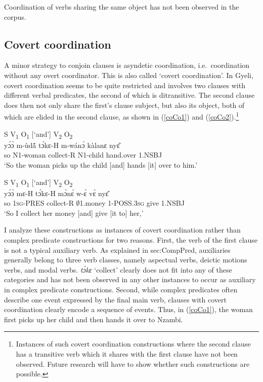 \noindent Coordination of verbs sharing the same object has not been observed in the corpus.


\subsection{Covert coordination}
A minor strategy to conjoin clauses is asyndetic coordination, i.e.\ coordination without any overt coordinator. This is also called `covert coordination'. In Gyeli, covert coordination seems to be quite restricted and involves two clauses with different verbal predicates, the second of which is ditransitive. The second clause does then not only share the first's clause subject, but also its object, both of which are elided in the second clause, as shown in (\ref{coCo1}) and (\ref{coCo2}).\footnote{Instances of such covert coordination constructions where the second clause has a transitive verb which it shares with the first clause have not been observed. Future research will have to show whether such constructions are possible.}

\begin{exe} 
\ex\label{coCo1} S V\textsubscript{1} O\textsubscript{1} [`and'] V\textsubscript{2} O\textsubscript{2}
  \glll [yɔ́ɔ̀ mùdã̂ tɔ́kɛ́ mwánɔ̀] [kàlànɛ̀ nyɛ̂] \\
       yɔ́ɔ̀ m-ùdã̂ tɔ́kɛ-H m-wánɔ̀ kàlanɛ nyɛ̂ \\
       so N1-woman collect-R N1-child hand.over 1.NSBJ\\
    \trans `So the woman picks up the child [and] hands [it] over to him.'
\end{exe}

\begin{exe} 
\ex\label{coCo2} S V\textsubscript{1} O\textsubscript{1} [`and'] V\textsubscript{2} O\textsubscript{2}
  \glll  [yɔ́ɔ̀ mɛ́ tɔ́kɛ́ mɔ̀nɛ́ wɛ̀] [vɛ̀ nyɛ̂] \\
         yɔ́ɔ̀ mɛ-H tɔ́kɛ-H mɔ̀nɛ́ w-ɛ̀ vɛ̀ nyɛ̂ \\
         so 1\textsc{sg}-PRES collect-R $\emptyset$1.money 1-POSS.3\textsc{sg} give 1.NSBJ   \\
    \trans `So I collect her money [and] give [it to] her,'
\end{exe}

I analyze these constructions as instances of covert coordination rather than complex predicate constructions for two reasons. First, the verb of the first clause is not a typical auxiliary verb. As explained in {sec:CompPred}, auxiliaries generally belong to three verb classes, namely aspectual verbs, deictic motions verbs, and modal verbs. {\itshape tɔ́kɛ} `collect' clearly does not fit into any of these categories and has not been observed in any other instances to occur as auxiliary in complex predicate constructions. Second, while complex predicates often describe one event expressed by the final main verb, clauses with covert coordination clearly encode a sequence of events. Thus, in (\ref{coCo1}), the woman first picks up her child and then hands it over to Nzambi.



